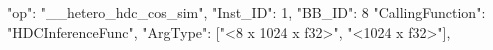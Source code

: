     "op": "__hetero_hdc_cos_sim",
    "Inst_ID": 1,
    "BB_ID": 8
    "CallingFunction": "HDCInferenceFunc",
    "ArgType": ["<8 x 1024 x f32>", "<1024 x f32>"],
